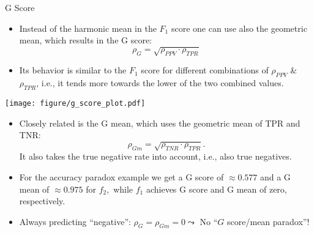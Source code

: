 \begin{vbframe}{G Score}
	\footnotesize
	
	\begin{minipage}[c]{0.5\textwidth}
	\footnotesize
	\begin{itemize}
		\item 	Instead of the harmonic mean in the $F_1$ score one can use also the geometric mean, which results in the G score: 
		$$\rho_{G} = \sqrt{\rho_{PPV} \cdot \rho_{TPR}}$$
		\item  Its behavior is similar to the $F_1$ score for different combinations of $\rho_{PPV}$ \& $\rho_{TPR}$, i.e., it tends more towards the lower of the two combined values.
	\end{itemize}
\end{minipage}%
\begin{minipage}[c]{0.5\textwidth}
	\centering
	\texttt{[image: figure/g\_score\_plot.pdf]}
\end{minipage}
%
\begin{itemize}
	\item %
	Closely related is the G mean, which uses the geometric mean of TPR and TNR:
	$$\rho_{Gm} = \sqrt{\rho_{TNR} \cdot \rho_{TPR}}.$$
	It also takes the true negative rate into account, i.e., also true negatives.
%	
	\item For the accuracy paradox example we get a G score of $\approx 0.577$ and a G mean of $\approx 0.975$ for $f_2,$ while $f_1$ achieves G score and G mean of zero, respectively.
%	
	\item Always predicting \enquote{negative}: $\rho_{G} = \rho_{Gm}  = 0 \leadsto$ No ``$G$ score/mean paradox''!
%
\end{itemize}
	
\end{vbframe}



